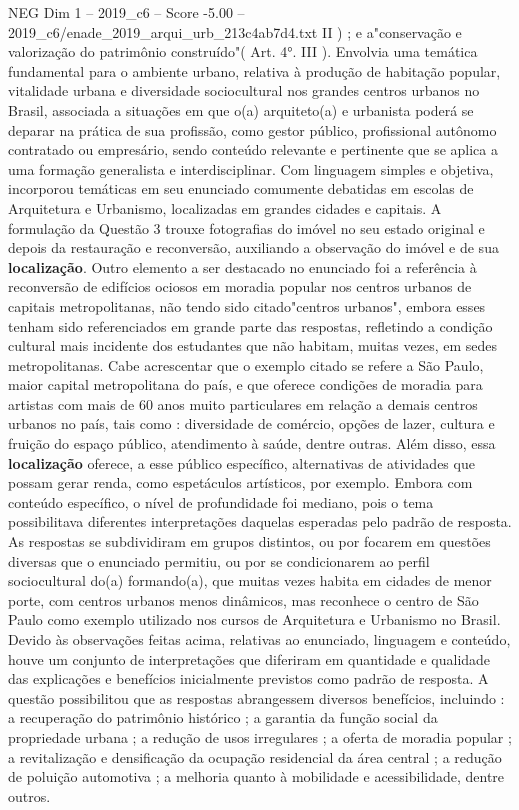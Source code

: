 \begin{textsample}{NEG Dim 1 – 2019\_c6 – Score -5.00 – 2019\_c6/enade\_2019\_arqui\_urb\_213c4ab7d4.txt}
II ) ; e a"conservação e valorização do patrimônio construído"( Art. 4{\EmojiFont °}.
III ).
Envolvia uma temática fundamental para o ambiente urbano, relativa à produção de habitação popular, vitalidade urbana e diversidade sociocultural nos grandes centros urbanos no Brasil, associada a situações em que o(a) arquiteto(a) e urbanista poderá se deparar na prática de sua profissão, como gestor público, profissional autônomo contratado ou empresário, sendo conteúdo relevante e pertinente que se aplica a uma formação generalista e interdisciplinar.
Com linguagem simples e objetiva, incorporou temáticas em seu enunciado comumente debatidas em escolas de Arquitetura e Urbanismo, localizadas em grandes cidades e capitais.
A formulação da Questão 3 trouxe fotografias do imóvel no seu estado original e depois da restauração e reconversão, auxiliando a observação do imóvel e de sua \textbf{localização}.
Outro elemento a ser destacado no enunciado foi a referência à reconversão de edifícios ociosos em moradia popular nos centros urbanos de capitais metropolitanas, não tendo sido citado"centros urbanos", embora esses tenham sido referenciados em grande parte das respostas, refletindo a condição cultural mais incidente dos estudantes que não habitam, muitas vezes, em sedes metropolitanas.
Cabe acrescentar que o exemplo citado se refere a São Paulo, maior capital metropolitana do país, e que oferece condições de moradia para artistas com mais de 60 anos muito particulares em relação a demais centros urbanos no país, tais como : diversidade de comércio, opções de lazer, cultura e fruição do espaço público, atendimento à saúde, dentre outras.
Além disso, essa \textbf{localização} oferece, a esse público específico, alternativas de atividades que possam gerar renda, como espetáculos artísticos, por exemplo.
Embora com conteúdo específico, o nível de profundidade foi mediano, pois o tema possibilitava diferentes interpretações daquelas esperadas pelo padrão de resposta.
As respostas se subdividiram em grupos distintos, ou por focarem em questões diversas que o enunciado permitiu, ou por se condicionarem ao perfil sociocultural do(a) formando(a), que muitas vezes habita em cidades de menor porte, com centros urbanos menos dinâmicos, mas reconhece o centro de São Paulo como exemplo utilizado nos cursos de Arquitetura e Urbanismo no Brasil.
Devido às observações feitas acima, relativas ao enunciado, linguagem e conteúdo, houve um conjunto de interpretações que diferiram em quantidade e qualidade das explicações e benefícios inicialmente previstos como padrão de resposta.
A questão possibilitou que as respostas abrangessem diversos benefícios, incluindo : a recuperação do patrimônio histórico ; a garantia da função social da propriedade urbana ; a redução de usos irregulares ; a oferta de moradia popular ; a revitalização e densificação da ocupação residencial da área central ; a redução de poluição automotiva ; a melhoria quanto à mobilidade e acessibilidade, dentre outros.

\end{textsample}
